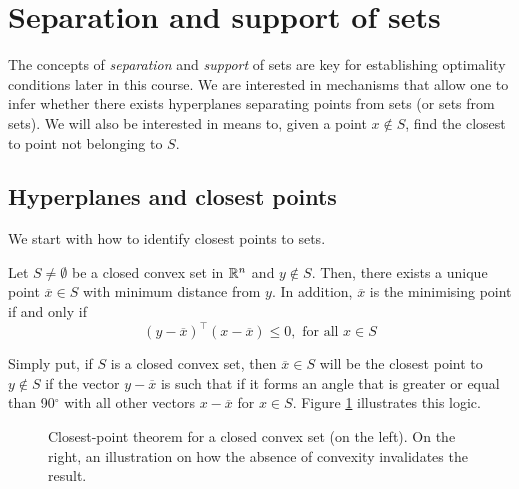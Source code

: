 \section{Separation and support of sets}
 

The concepts of \emph{separation} and \emph{support} of sets are key for establishing optimality conditions later in this course. We are interested in mechanisms that allow one to infer whether there exists hyperplanes separating points from sets (or sets from sets). We will also be interested in means to, given a point $x \notin S$, find the closest to point not belonging to $S$.

\subsection{Hyperplanes and closest points}

We start with how to identify closest points to sets. 
%
\begin{theorem}\label{thm:closest_point}
Let $S \neq \emptyset$ be a closed convex set in $\mathbb{R}^n$ and $y \notin S$. Then, there exists a unique point $\overline{x} \in S$ with minimum distance from $y$. In addition, $\overline{x}$ is the minimising point if and only if $$(y-\overline{x})^\top(x - \overline{x}) \leq 0, \text{ for all } x\in S$$
\end{theorem}
%
Simply put, if $S$ is a closed convex set, then $\overline{x} \in S$ will be the closest point to $y \notin S$ if the vector $y - \overline{x}$ is such that if it forms an angle that is greater or equal than 90$^\circ$ with all other vectors $x - \overline{x}$ for $x \in S$. Figure \ref{fig:closest_point} illustrates this logic. 

\begin{figure}[h]
	\caption{Closest-point theorem for a closed convex set (on the left). On the right, an illustration on how the absence of convexity invalidates the result.} \label{fig:closest_point}
\end{figure}

